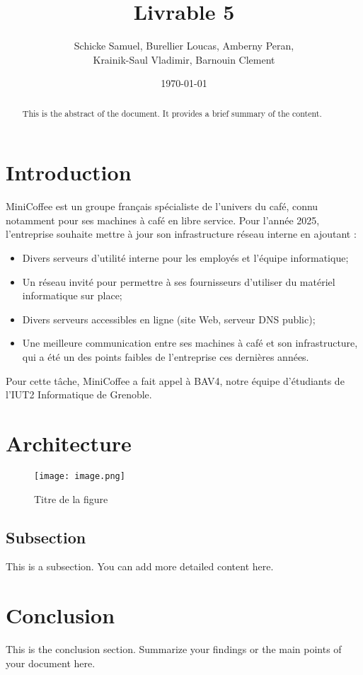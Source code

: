 \documentclass{article}
\title{Livrable 5}
\author{
Schicke Samuel, Burellier Loucas, Amberny Peran, \\
Krainik-Saul Vladimir, Barnouin Clement
}
\date{\today}
\begin{document}


\maketitle

\begin{abstract}
This is the abstract of the document. It provides a brief summary of the content.
\end{abstract}

\section{Introduction}
MiniCoffee est un groupe français spécialiste de l’univers du café, connu notamment pour ses machines à café en libre service. Pour l’année 2025, l’entreprise souhaite mettre à jour son infrastructure réseau interne en ajoutant : 
\begin{itemize}
    \item Divers serveurs d’utilité interne pour les employés et l'équipe informatique;
    \item Un réseau invité pour permettre à ses fournisseurs d’utiliser du matériel informatique sur place;
    \item Divers serveurs accessibles en ligne (site Web, serveur DNS public);
    \item Une meilleure communication entre ses machines à café et son infrastructure, qui a été un des points faibles de l’entreprise ces dernières années.
\end{itemize}
Pour cette tâche, MiniCoffee a fait appel à BAV4, notre équipe d’étudiants de l’IUT2 Informatique de Grenoble.

\section{Architecture}

\begin{figure}
    \texttt{[image: image.png]}
    \caption{Titre de la figure}
    \end{figure}

\subsection{Subsection}
This is a subsection. You can add more detailed content here.

\section{Conclusion}
This is the conclusion section. Summarize your findings or the main points of your document here.
\end{document}
